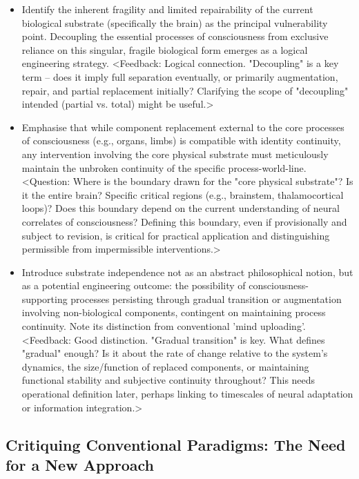 \documentclass[10pt]{article}
\begin{document}
\begin{sloppypar}
\begin{itemize}
    \item Identify the inherent fragility and limited repairability of the current biological substrate (specifically the brain) as the principal vulnerability point. Decoupling the essential processes of consciousness from exclusive reliance on this singular, fragile biological form emerges as a logical engineering strategy. <Feedback: Logical connection. "Decoupling" is a key term – does it imply full separation eventually, or primarily augmentation, repair, and partial replacement initially? Clarifying the scope of "decoupling" intended (partial vs. total) might be useful.>

    \item Emphasise that while component replacement external to the core processes of consciousness (e.g., organs, limbs) is compatible with identity continuity, any intervention involving the core physical substrate must meticulously maintain the unbroken continuity of the specific process-world-line. <Question: Where is the boundary drawn for the "core physical substrate"? Is it the entire brain? Specific critical regions (e.g., brainstem, thalamocortical loops)? Does this boundary depend on the current understanding of neural correlates of consciousness? Defining this boundary, even if provisionally and subject to revision, is critical for practical application and distinguishing permissible from impermissible interventions.>

    \item Introduce substrate independence not as an abstract philosophical notion, but as a potential engineering outcome: the possibility of consciousness-supporting processes persisting through gradual transition or augmentation involving non-biological components, contingent on maintaining process continuity. Note its distinction from conventional 'mind uploading'. <Feedback: Good distinction. "Gradual transition" is key. What defines "gradual" enough? Is it about the rate of change relative to the system's dynamics, the size/function of replaced components, or maintaining functional stability and subjective continuity throughout? This needs operational definition later, perhaps linking to timescales of neural adaptation or information integration.>

  \end{itemize}

  \subsection{Critiquing Conventional Paradigms: The Need for a New Approach}
  \label{sec:new-paradigm}


\end{sloppypar}
\end{document}
